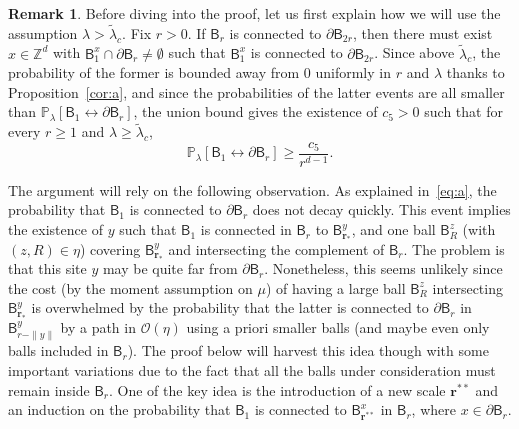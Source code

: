 \documentclass[10pt]{amsart}
\theoremstyle{definition}\newtheorem{defi}[theo]{Definition}\newtheorem{rema}[theo]{Remark}\newtheorem{exam}[theo]{Example}\newtheorem{exem}[theo]{Example}\newtheorem{nota}[theo]{Notation}
\newcommand{\rbf}{\mathbf{r}}
\begin{document}
\begin{rema}
Before diving into the proof, let us first explain how we will use the assumption $\lambda>\widetilde\lambda_c$. Fix $r>0$. If $\mathsf B_r$ is connected to $ \partial\mathsf B_{2r}$, then there must exist $x\in{\mathbb Z}^d$ with $\mathsf B^x_1\cap\partial\mathsf B_r\ne \emptyset$ such that $\mathsf B^x_1$ is connected to $\partial\mathsf B_{2r}$.
Since above $\widetilde\lambda_c$, the probability of the former is bounded away from 0 uniformly in $r$ and $\lambda$ thanks to Proposition~\ref{cor:a}, and since the probabilities of the latter events are all smaller than ${\mathbb P}_\lambda[\mathsf B_1\longleftrightarrow \partial\mathsf B_r]$, the union bound gives the existence of $c_5>0$ such that for every $r\ge1$ and $\lambda\ge\widetilde\lambda_c$,
\begin{equation}\label{eq:a}
{\mathbb P}_\lambda[\mathsf B_1\longleftrightarrow \partial\mathsf B_r]\ge \frac{c_5}{r^{d-1}}.
\end{equation}
\end{rema}

The argument will rely on the following observation. As explained in~\eqref{eq:a}, the probability that $\mathsf B_1$ is connected to $\partial\mathsf B_r$ does not decay quickly. This event implies the existence of $y$ such that $\mathsf B_1$ is connected in $\mathsf B_r$ to $\mathsf B_{\rbf_*}^y$, and one ball $\mathsf B_R^z$ (with $(z,R)\in\eta$) covering $\mathsf B_{\rbf_*}^y$ and intersecting the complement of $\mathsf B_r$. The problem is that this site $y$ may be quite far from $\partial\mathsf B_r$. Nonetheless, this seems unlikely since the cost (by the moment assumption on $\mu$) of having a large ball $\mathsf B_R^z$ intersecting $\mathsf B_{\rbf_*}^y$ is overwhelmed by the probability that the latter is connected to $\partial\mathsf B_r$ in $\mathsf B_{r-\|y\|}^y$ by a path in ${\mathcal O}(\eta)$ using a priori smaller balls (and maybe even only balls included in $\mathsf B_r$). The proof below will harvest this idea though with some important variations due to the fact that all the balls under consideration must remain inside $\mathsf B_r$. One of the key idea is the introduction of a new scale $\rbf^{**}$ and an induction on the probability that $\mathsf B_1$ is connected to $\mathsf B_{\rbf^{**}}^x$ in $\mathsf B_r$, where $x\in\partial\mathsf B_r$.
\end{document}
